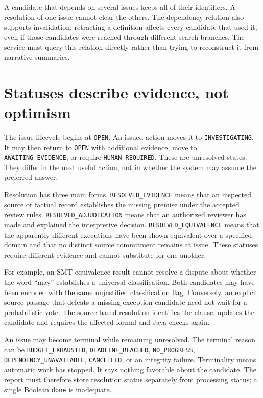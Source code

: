 A candidate that depends on several issues keeps all of their identifiers. A
resolution of one issue cannot clear the others. The dependency relation also
supports invalidation: retracting a definition affects every candidate that used
it, even if those candidates were reached through different search branches.
The service must query this relation directly rather than trying to reconstruct
it from narrative summaries.

\section{Statuses describe evidence, not optimism}
\label{merge:M06:07}


The issue lifecycle begins at \texttt{OPEN}. An issued action moves it to
\texttt{INVESTIGATING}. It may then return to \texttt{OPEN} with additional evidence,
move to \texttt{AWAITING\_EVIDENCE}, or require \texttt{HUMAN\_REQUIRED}. These are
unresolved states. They differ in the next useful action, not in whether the
system may assume the preferred answer.

Resolution has three main forms. \texttt{RESOLVED\_EVIDENCE} means that an inspected
source or factual record establishes the missing premise under the accepted
review rules. \texttt{RESOLVED\_ADJUDICATION} means that an authorized reviewer has
made and explained the interpretive decision. \texttt{RESOLVED\_EQUIVALENCE} means
that the apparently different executions have been shown equivalent over a
specified domain and that no distinct source commitment remains at issue.
These statuses require different evidence and cannot substitute for one another.

For example, an SMT equivalence result cannot resolve a dispute about whether the
word ``may'' establishes a universal classification. Both candidates may have
been encoded with the same unjustified classification flag. Conversely, an
explicit source passage that defeats a missing-exception candidate need not wait
for a probabilistic vote. The source-based resolution identifies the clause,
updates the candidate and requires the affected formal and Java checks again.


An issue may become terminal while remaining unresolved. The terminal reason can
be \texttt{BUDGET\_EXHAUSTED}, \texttt{DEADLINE\_REACHED}, \texttt{NO\_PROGRESS},
\texttt{DEPENDENCY\_UNAVAILABLE}, \texttt{CANCELLED}, or an integrity failure.
Terminality means automatic work has stopped. It says nothing favorable about
the candidate. The report must therefore store resolution status separately from
processing status; a single Boolean \texttt{done} is inadequate.

